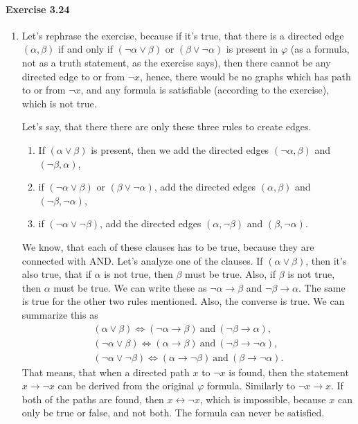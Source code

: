\documentclass[a4paper,12pt]{article}
\newcommand{\exercise}[1]{\paragraph{Exercise #1}}
\begin{document}
    \exercise{3.24} \cite{e_maxx_algorithms_in_english}
    \begin{enumerate}[label=(\arabic*)]
        \item Let's rephrase the exercise, because if it's true, that there is a directed edge $(\alpha, \beta)$ if and only if $(\neg \alpha \vee \beta)$ or $(\beta \vee \neg \alpha)$ is present in $\varphi$ (as a formula, not as a truth statement, as the exercise says), then there cannot be any directed edge to or from $\neg x$, hence, there would be no graphs which has path to or from $\neg x$, and any formula is satisfiable (according to the exercise), which is not true.

            Let's say, that there there are only these three rules to create edges.
            \begin{enumerate}[label=(\roman*)]
                \item If $(\alpha \vee \beta)$ is present, then we add the directed edges $(\neg \alpha, \beta)$ and $(\neg \beta, \alpha)$,
                \item if $(\neg \alpha \vee \beta)$ or $(\beta \vee \neg \alpha)$, add the directed edges $(\alpha, \beta)$ and $(\neg \beta, \neg \alpha)$,
                \item if $(\neg \alpha \vee \neg \beta)$, add the directed edges $(\alpha, \neg \beta)$ and $(\beta, \neg \alpha)$.
            \end{enumerate}

            We know, that each of these clauses has to be true, because they are connected with AND. Let's analyze one of the clauses. If $(\alpha \vee \beta)$, then it's also true, that if $\alpha$ is not true, then $\beta$ must be true. Also, if $\beta$ is not true, then $\alpha$ must be true. We can write these as $\neg \alpha \rightarrow \beta$ and $\neg \beta \rightarrow \alpha$. The same is true for the other two rules mentioned. Also, the converse is true. We can summarize this as
            \begin{gather}
                \nonumber
                (\alpha \vee \beta) \Leftrightarrow (\neg \alpha \rightarrow \beta) \ \textrm{and}\ (\neg \beta \rightarrow \alpha) \textrm{,}\\
                (\neg \alpha \vee \beta) \Leftrightarrow (\alpha \rightarrow \beta) \ \textrm{and}\ (\neg \beta \rightarrow \neg \alpha) \textrm{,}\\
                (\neg \alpha \vee \neg \beta) \Leftrightarrow (\alpha \rightarrow \neg \beta) \ \textrm{and}\ (\beta \rightarrow \neg \alpha) \textrm{.}
            \end{gather} That means, that when a directed path $x$ to $\neg x$
            is found, then the statement $x \rightarrow \neg x$ can be derived
            from the original $\varphi$ formula. Similarly to $\neg x
            \rightarrow x$. If both of the paths are found, then $x
            \leftrightarrow \neg x$, which is impossible, because $x$ can only
            be true or false, and not both. The formula can never be satisfied.


\end{enumerate}
\end{document}
